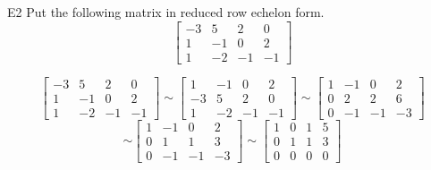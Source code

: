 \begin{problem}{E2}
Put the following matrix in reduced row echelon form.
\[
  \begin{bmatrix}
    -3 & 5 & 2 & 0 \\
    1 & -1 & 0 & 2 \\
    1 & -2 & -1 & -1
  \end{bmatrix}
\]
\end{problem}
\begin{solution}
\[
  \begin{bmatrix}
  -3 & 5 & 2 & 0 \\
   1 & -1 & 0 & 2 \\
   1 & -2 & -1 & -1
  \end{bmatrix} \sim
  \begin{bmatrix}
   1 & -1 & 0 & 2 \\
  -3 & 5 & 2 & 0 \\
   1 & -2 & -1 & -1
  \end{bmatrix} \sim
  \begin{bmatrix}
   1 & -1 & 0 & 2 \\
   0 & 2 & 2 & 6 \\
   0 & -1 & -1 & -3
  \end{bmatrix}
\]
\[
  \sim
  \begin{bmatrix}
   1 & -1 & 0 & 2 \\
   0 & 1 & 1 & 3 \\
   0 & -1 & -1 & -3
  \end{bmatrix} \sim
  \begin{bmatrix}
   1 & 0 & 1 & 5 \\
   0 & 1 & 1 & 3 \\
   0 & 0 & 0 & 0
  \end{bmatrix}
\]
\end{solution}


